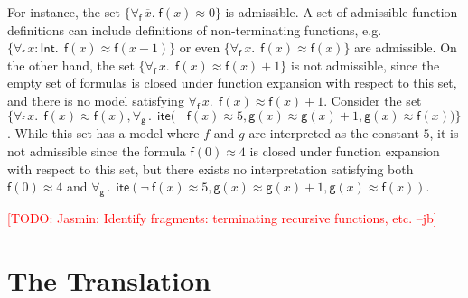 \documentclass[runningheads,a4paper]{llncs}
\newcommand{\con}[1]{\mathsf{#1}}
\renewcommand\vec[1]{\overline{#1}}
\let\oldneg=\neg
\def\neg{\oldneg\:}
\newcommand{\teq}{\approx}
\newcommand{\sortint}{\ty{Int}}
\newcommand\ty[1]{\con{#1}}
\newcommand{\lite}{\con{ite}}
\newcommand{\forallf}[1]{\forall_{\!#1\:}}
\newcommand{\rem}[1]{\textcolor{red}{[#1]}}
\newcommand{\jb}[1]{\rem{#1 --jb}}
\begin{document}
For instance, the set $\{ \forallf{\con{f}} \vec x.\; \con{f}( x ) \teq 0 \}$ is admissible.
A set of admissible function definitions can include definitions of non-terminating functions, e.g.
$\{ \forallf{\con{f}} x : \sortint.\;\, \con{f}( x ) \teq \con{f}( x - 1 ) \}$ or even $\{ \forallf{\con{f}} x.\;\, \con{f}( x ) \teq \con{f}( x ) \}$ are admissible.
On the other hand, the set $\{ \forallf{\con{f}} x.\;\, \con{f}( x ) \teq \con{f}( x ) + 1 \}$ is not admissible,
since the empty set of formulas is closed under function expansion with respect to this set,
and there is no model satisfying $\forallf{\con{f}} x.\;\, \con{f}( x ) \teq \con{f}( x ) + 1$.
Consider the set $\{ \forallf{\con{f}} x.\;\, \con{f}( x ) \teq \con{f}( x ), \forallf{\con{g}}.\;\, \lite\bigl( \neg \con{f}( x ) \teq 5, \con{g}( x ) \teq \con{g}( x ) + 1, \con{g}( x ) \teq \con{f}( x ) \bigr) \}$.
While this set has a model where $f$ and $g$ are interpreted as the constant $5$, it is not admissible
since the formula $\con{f}( 0 ) \teq 4$ is closed under function expansion with respect to this set,
but there exists no interpretation satisfying both $\con{f}( 0 ) \teq 4$ and $\forallf{\con{g}}.\;\, \lite( \neg \con{f}( x ) \teq 5, \con{g}( x ) \teq \con{g}( x ) + 1, \con{g}( x ) \teq \con{f}( x ) )$.


\jb{TODO: Jasmin: Identify fragments: terminating recursive functions, etc.}


\section{The Translation}
\label{sec:encoding}
\end{document}
